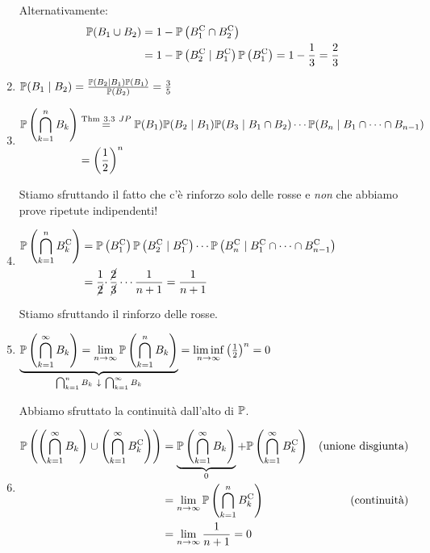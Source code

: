 \begin{enumerate}
Alternativamente:\begin{equation*}
\begin{aligned}
\mathbb{P}( B_{1} \cup B_{2}) & =1-\mathbb{P}\left( B_{1}^{\mathrm{C}} \cap B_{2}^{\mathrm{C}}\right)\\
 & =1-\mathbb{P}\left( B_{2}^{\mathrm{C}} \mid B_{1}^{\mathrm{C}}\right)\mathbb{P}\left( B_{1}^{\mathrm{C}}\right) =1-\frac{1}{3} =\frac{2}{3}
\end{aligned}
\end{equation*}
\item $\mathbb{P}( B_{1} \mid B_{2}) =\frac{\mathbb{P}( B_{2} \mid B_{1})\mathbb{P}( B_{1})}{\mathbb{P}( B_{2})} =\frac{3}{5}$
\item $\begin{aligned}
\mathbb{P}\left(\bigcap\limits _{k=1}^{n} B_{k}\right) & \overset{\text{Thm} \ 3.3\ JP}{=}\mathbb{P}( B_{1})\mathbb{P}( B_{2} \mid B_{1})\mathbb{P}( B_{3} \mid B_{1} \cap B_{2}) \cdots \mathbb{P}( B_{n} \mid B_{1} \cap \cdots \cap B_{n-1})\\
 & =\left(\frac{1}{2}\right)^{n}
\end{aligned}$

Stiamo sfruttando il fatto che c'è rinforzo solo delle rosse e \textit{non} che abbiamo prove ripetute indipendenti!
\item $\begin{aligned}
\mathbb{P}\left(\bigcap\limits _{k=1}^{n} B_{k}^{\mathrm{C}}\right) & =\mathbb{P}\left( B_{1}^{\mathrm{C}}\right)\mathbb{P}\left( B_{2}^{\mathrm{C}} \mid B_{1}^{\mathrm{C}}\right) \cdots \mathbb{P}\left( B_{n}^{\mathrm{C}} \mid B_{1}^{\mathrm{C}} \cap \cdots \cap B_{n-1}^{\mathrm{C}}\right)\\
 & =\frac{1}{\cancel{2}} \cdotp \frac{\cancel{2}}{\cancel{3}} \cdots \frac{1}{n+1} =\frac{1}{n+1}
\end{aligned}$

Stiamo sfruttando il rinforzo delle rosse.
\item $\underbrace{\mathbb{P}\left(\bigcap\limits _{k=1}^{\infty } B_{k}\right) =\lim\limits _{n\rightarrow \infty }\mathbb{P}\left(\bigcap\limits _{k=1}^{n} B_{k}\right)}_{\bigcap _{k=1}^{n} B_{k} \ \downarrow \ \bigcap _{k=1}^{\infty } B_{k}} =\liminf\limits _{n\rightarrow \infty }\left(\frac{1}{2}\right)^{n} =0$

Abbiamo sfruttato la continuità dall'alto di $\mathbb{P}$.
\item $\begin{aligned}
\mathbb{P}\left(\left(\bigcap\limits _{k=1}^{\infty } B_{k}\right) \cup \left(\bigcap\limits _{k=1}^{\infty } B_{k}^{\mathrm{C}}\right)\right) & =\underbrace{\mathbb{P}\left(\bigcap\limits _{k=1}^{\infty } B_{k}\right)}_{0} +\mathbb{P}\left(\bigcap\limits _{k=1}^{\infty } B_{k}^{\mathrm{C}}\right) & \text{(unione disgiunta)}\\
 & =\lim\limits _{n\rightarrow \infty }\mathbb{P}\left(\bigcap\limits _{k=1}^{n} B_{k}^{\mathrm{C}}\right) & \text{(continuità)}\\
 & =\lim\limits _{n\rightarrow \infty }\frac{1}{n+1} =0 & 
\end{aligned}$
\end{enumerate}
\Soluzione